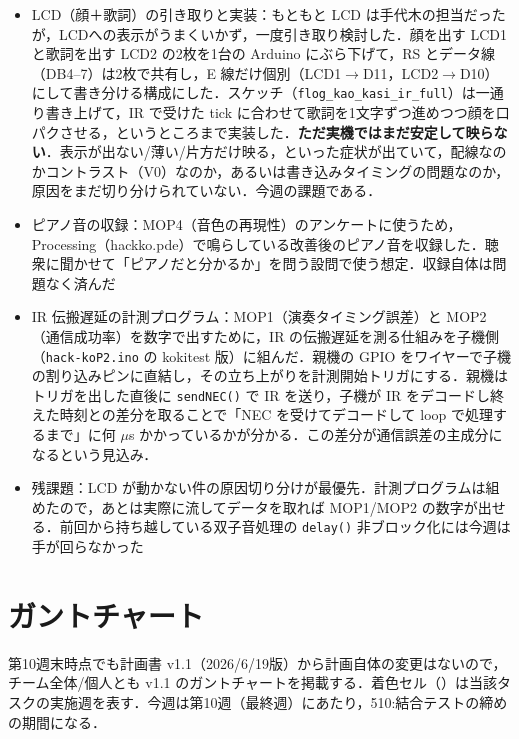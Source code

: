 \documentclass[a4paper,11pt]{ltjsarticle}
\providecommand{\％}{\%}
\begin{document}
\begin{itemize}
    \item LCD（顔＋歌詞）の引き取りと実装：もともと LCD は手代木の担当だったが，LCDへの表示がうまくいかず，一度引き取り検討した．顔を出す LCD1 と歌詞を出す LCD2 の2枚を1台の Arduino にぶら下げて，RS とデータ線（DB4--7）は2枚で共有し，E 線だけ個別（LCD1$\to$D11，LCD2$\to$D10）にして書き分ける構成にした．スケッチ（\texttt{flog\_kao\_kasi\_ir\_full}）は一通り書き上げて，IR で受けた tick に合わせて歌詞を1文字ずつ進めつつ顔を口パクさせる，というところまで実装した．\textbf{ただ実機ではまだ安定して映らない}．表示が出ない/薄い/片方だけ映る，といった症状が出ていて，配線なのかコントラスト（V0）なのか，あるいは書き込みタイミングの問題なのか，原因をまだ切り分けられていない．今週の課題である．
    \item ピアノ音の収録：MOP4（音色の再現性）のアンケートに使うため，Processing（hackko.pde）で鳴らしている改善後のピアノ音を収録した．聴衆に聞かせて「ピアノだと分かるか」を問う設問で使う想定．収録自体は問題なく済んだ
    \item IR 伝搬遅延の計測プログラム：MOP1（演奏タイミング誤差）と MOP2（通信成功率）を数字で出すために，IR の伝搬遅延を測る仕組みを子機側（\texttt{hack-koP2.ino} の kokitest 版）に組んだ．親機の GPIO をワイヤーで子機の割り込みピンに直結し，その立ち上がりを計測開始トリガにする．親機はトリガを出した直後に \texttt{sendNEC()} で IR を送り，子機が IR をデコードし終えた時刻との差分を取ることで「NEC を受けてデコードして loop で処理するまで」に何 $\mu$s かかっているかが分かる．この差分が通信誤差の主成分になるという見込み．
    \item 残課題：LCD が動かない件の原因切り分けが最優先．計測プログラムは組めたので，あとは実際に流してデータを取れば MOP1/MOP2 の数字が出せる．前回から持ち越している双子音処理の \texttt{delay()} 非ブロック化には今週は手が回らなかった
\end{itemize}

\section{ガントチャート}\label{sec:gantt}

第10週末時点でも計画書 v1.1（2026/6/19版）から計画自体の変更はないので，チーム全体/個人とも v1.1 のガントチャートを掲載する．着色セル（\colorbox{ganttCell}{\phantom{xx}}）は当該タスクの実施週を表す．今週は第10週（最終週）にあたり，510:結合テストの締めの期間になる．

\renewcommand{\arraystretch}{1.3}
\end{document}

